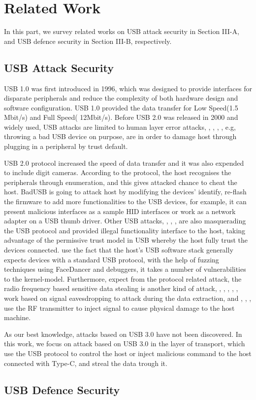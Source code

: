 \section{Related Work}
\label{section:related_work}
In this part, we survey related works on USB attack security in Section III-A, and USB defence security in Section III-B, respectively.
\subsection{USB Attack Security}
USB 1.0\cite{usb01} was first introduced in 1996, which was designed to provide interfaces for disparate peripherals and reduce the complexity of both hardware design and software configuration\cite{sok}. USB 1.0 provided the data transfer for Low Speed(1.5 Mbit/s) and Full Speed( 12Mbit/s). Before USB 2.0 was released in 2000 and widely used, USB attacks are limited to human layer error attacks, \cite{se}, \cite{goverment}, \cite{atkvec}, \cite{ueerreallydo}, e.g, throwing a bad USB device on purpose, are in order to damage host through plugging in a peripheral by trust default. 

USB 2.0 protocol increased the speed of data transfer and it was also expended to include digit cameras. According to the protocol, the host recognises the peripherals through enumeration, and this gives attacked chance to cheat the host. BadUSB\cite{badusb} is going to attack host by modifying the devices' identify, re-flash the firmware to add more functionalities to the USB devices, for example, it can present malicious interfaces as a sample HID interfaces or work as a network adapter on a USB thumb driver. Other USB attacks, \cite{rubber}, \cite{usbdriver}, \cite{usbbypassing}, \cite{iseeyou} are also masquerading the USB protocol and provided illegal functionality interface to the host, taking advantage of the permissive trust model in USB whereby the host fully trust the devices connected. \cite{syzkaller} use the fact that the host's USB software stack generally expects devices with a standard USB protocol, with the help of fuzzing techniques using FaceDancer \cite{facedancer} and debuggers, it takes a number of vulnerabilities to the kernel-model. Furthermore, expect from the protocol related attack, the radio frequency based sensitive data stealing is another kind of attack, \cite{smartphone} , \cite{poweremi}, \cite{badusbhub}, \cite{usbfinger}, \cite{side}, \cite{usbdriver} work based on signal eavesdropping to attack during the data extraction, and \cite{usbkiller}, \cite{cable}, \cite{usbee}, \cite{turnip} use the RF transmitter to inject signal to cause physical damage to the host machine.    

As our best knowledge, attacks based on USB 3.0\cite{usb03} have not been discovered. In this work, we focus on attack based on USB 3.0 in the layer of transport\cite{sok}, which use the USB protocol to control the host or inject malicious command to the host connected with Type-C\cite{typec}, and streal the data trough it.

\subsection{USB Defence Security}
